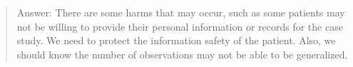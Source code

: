 \documentclass[
]{article}
\begin{document}
\begin{quote}
Answer: There are some harms that may occur, such as some patients may
not be willing to provide their personal information or records for the
case study. We need to protect the information safety of the patient.
Also, we should know the number of observations may not be able to be
generalized.
\end{quote}
\end{document}

